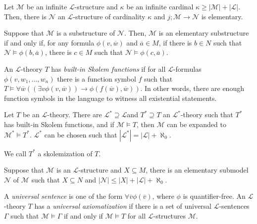 \documentclass[
	fontsize=10pt, %
]{kaohandt}
\begin{document}
\begin{theorem}
    Let $\mathcal{M}$ be an infinite $\mathcal{L}$-structure and 
    $\kappa$ be an infinite cardinal $\kappa \ge |\mathcal{M}| + |\mathcal{L}|$.
    Then, there is $\mathcal{N}$ an $\mathcal{L}$-structure of cardinality $\kappa$ and $j; \mathcal{M} \to \mathcal{N}$ is elementary.
\end{theorem}

\begin{proposition}
    Suppose that $\mathcal{M}$ is a substructure of $\mathcal{N}$.
    Then, $\mathcal{M}$ is an elementary substructure if and only if,
    for any formula $\phi(v,\overline{w})$ and $\overline{a} \in M$,
    if there is $b \in N$ such that $\mathcal{N} \models \phi(b,\overline{a})$,
    there is $c \in M$ such that $\mathcal{N} \models \phi(c,\overline{a})$.
\end{proposition}

An $\mathcal{L}$-theory $T$ has \emph{built-in Skolem functions}
if for all $\mathcal{L}$-formulas $\phi(v,w_1,\dots,w_n)$ there is a function symbol $f$ such that $T \models \forall \overline{w} ((\exists v \phi(v,\overline{w})) \to \phi(f(\overline{w}),\overline{w}))$.
In other words, there are enough function symbols in the language to witness all existential statements.

\begin{lemma}
    Let $T$ be an $\mathcal{L}$-theory. 
    There are $\mathcal{L}^* \supseteq \mathcal{L}$and $T^* \supseteq T$ an $\mathcal{L}^*$-theory such that $T^*$ has built-in Skolem functions, 
    and if $\mathcal{M} \models T$, 
    then $\mathcal{M}$ can be expanded to $\mathcal{M}^* \models T^*$. 
    $\mathcal{L}^*$ can be chosen such that $|\mathcal{L}^*|= |\mathcal{L}|+\aleph_0$.

    We call $T^*$ a skolemization of $T$.
\end{lemma}

\begin{theorem}
    Suppose that $\mathcal{M}$ is an $\mathcal{L}$-structure and 
    $X \subseteq M$, there is an elementary submodel $\mathcal{N}$ of $\mathcal{M}$ such that $X \subseteq N$ and $|\mathcal{N}| \le |X| + |\mathcal{L}| + \aleph_0$.
\end{theorem}

\begin{definition}
    A \emph{universal sentence} is one of the form 
    $\forall \overline{v} \phi(\overline{v})$,
    where $\phi$ is quantifier-free.
    An $\mathcal{L}$-theory $T$ has a \emph{universal axiomatization} if there is a set of universal $\mathcal{L}$-sentences $\Gamma$
    such that $\mathcal{M} \models \Gamma$ if and only if $\mathcal{M} \models T$ for all $\mathcal{L}$-structures $\mathcal{M}$.
\end{definition}
\end{document}
